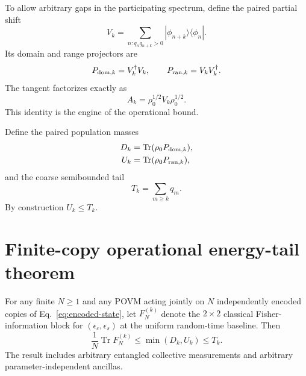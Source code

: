 \documentclass[aps,pra,reprint,amsmath,amssymb,longbibliography]{revtex4-2}
\newcommand{\Tr}{\operatorname{Tr}}
\begin{document}
To allow arbitrary gaps in the participating spectrum, define the paired partial shift
\begin{equation}
 V_k=\sum_{n:q_nq_{n+k}>0}|\phi_{n+k}\rangle\langle\phi_n|.
 \label{eq:Vk}
\end{equation}
Its domain and range projectors are
\begin{equation}
 P_{{\rm dom},k}=V_k^\dagger V_k,
 \qquad
 P_{{\rm ran},k}=V_kV_k^\dagger.
\end{equation}
The tangent factorizes exactly as
\begin{equation}
 \boxed{A_k=\rho_0^{1/2}V_k\rho_0^{1/2}}.
 \label{eq:tangent-factorization}
\end{equation}
This identity is the engine of the operational bound.

Define the paired population masses
\begin{align}
 D_k&=\Tr(\rho_0P_{{\rm dom},k}),\\
 U_k&=\Tr(\rho_0P_{{\rm ran},k}),
 \label{eq:DU}
\end{align}
and the coarse semibounded tail
\begin{equation}
 T_k=\sum_{m\geq k}q_m.
 \label{eq:Tk}
\end{equation}
By construction $U_k\leq T_k$.

\section{Finite-copy operational energy-tail theorem}
\label{sec:discrete-theorem}

\begin{theorem}
\label{thm:finite-copy}
For any finite $N\geq1$ and any POVM acting jointly on $N$ independently encoded copies of Eq.~\eqref{eq:encoded-state}, let $F_N^{(k)}$ denote the $2\times2$ classical Fisher-information block for $(\epsilon_c,\epsilon_s)$ at the uniform random-time baseline.  Then
\begin{equation}
 \boxed{
 \frac1N\Tr F_N^{(k)}\leq\min(D_k,U_k)\leq T_k .
 }
 \label{eq:main-discrete}
\end{equation}
The result includes arbitrary entangled collective measurements and arbitrary parameter-independent ancillas.
\end{theorem}
\end{document}
